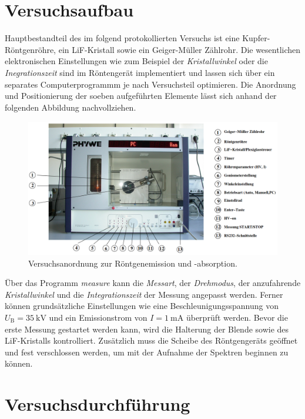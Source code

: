 %

%
\section{Versuchsaufbau}
\label{sec:Versuchsaufbau}

Hauptbestandteil des im folgend protokollierten Versuchs ist eine Kupfer-Röntgenröhre, ein LiF-Kristall sowie ein Geiger-Müller Zählrohr. Die wesentlichen 
elektronischen Einstellungen wie zum Beispiel der \emph{Kristallwinkel} oder die \emph{Inegrationszeit} sind im Röntengerät implementiert und lassen 
sich über ein separates Computerprogrammm je nach Versuchsteil optimieren. Die Anordnung und Positionierung der soeben aufgeführten Elemente lässt sich 
anhand der folgenden Abbildung nachvollziehen.

\begin{figure}[H]
    \centering
    \includegraphics[height=6cm]{content/Aufbau.png}
    \caption{Versuchsanordnung zur Röntgenemission und -absorption\cite{Versuchsanleitung_v602}.}
    \label{fig:Aufbau}
\end{figure}

\noindent Über das Programm \emph{measure} kann die \emph{Messart}, der \emph{Drehmodus}, der anzufahrende \emph{Kristallwinkel} und die \emph{Integrationszeit}
der Messung angepasst werden. Ferner können grundsätzliche Einstellungen wie eine Beschleunigungsspannung von $U_\text{B} = \qty{35}{\kilo\volt}$ und ein Emissionstrom 
von $I = \qty{1}{\milli\ampere}$ überprüft werden. Bevor die erste Messung  gestartet werden kann, wird die Halterung der Blende sowie des LiF-Kristalls kontrolliert. 
Zusätzlich muss die Scheibe des Röntgengeräts geöffnet und fest verschlossen werden, um mit der Aufnahme der Spektren beginnen zu können. 

\section{Versuchsdurchführung}
\label{sec:Versuchsdurchfuehrung}

